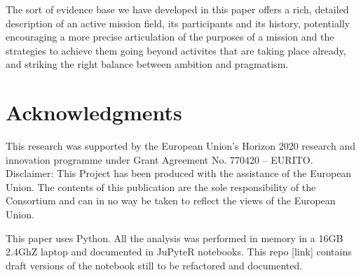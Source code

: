 \documentclass[11pt]{article}
\begin{document}
The sort of evidence base we have developed in this paper offers a rich, detailed description of an active mission field, its participants and its history, potentially encouraging a more precise articulation of the purposes of a mission and the strategies to achieve them going beyond activites that are taking place already, and striking the right balance between ambition and pragmatism. 



\section*{Acknowledgments}
\small{
This research was supported by the European Union's Horizon 2020 research and innovation programme under Grant Agreement No. 770420 – EURITO. Disclaimer: This Project has been produced with the assistance of the European Union. The contents of this publication are the sole responsibility of the Consortium and can in no way be taken to reflect the views of the European Union.

This paper uses Python. All the analysis was performed in memory in a 16GB 2.4GhZ laptop and documented in JuPyteR notebooks. This repo [link] contains draft versions of the notebook still to be refactored and documented.}


\singlespacing
\setlength\bibsep{0pt}


\end{document}
